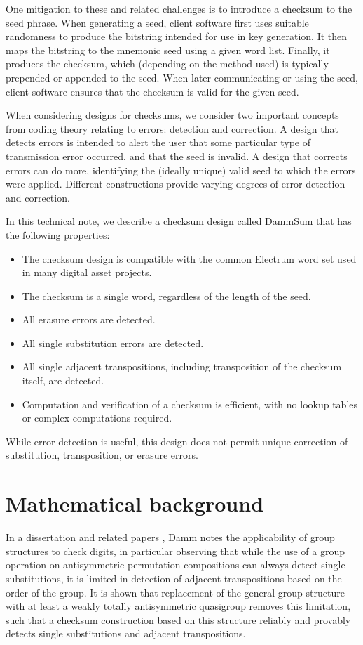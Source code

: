 \documentclass{article}
\theoremstyle{plain}
\theoremstyle{definition}
\begin{document}
One mitigation to these and related challenges is to introduce a checksum to the seed phrase.
When generating a seed, client software first uses suitable randomness to produce the bitstring intended for use in key generation.
It then maps the bitstring to the mnemonic seed using a given word list.
Finally, it produces the checksum, which (depending on the method used) is typically prepended or appended to the seed.
When later communicating or using the seed, client software ensures that the checksum is valid for the given seed.

When considering designs for checksums, we consider two important concepts from coding theory relating to errors: detection and correction.
A design that detects errors is intended to alert the user that some particular type of transmission error occurred, and that the seed is invalid.
A design that corrects errors can do more, identifying the (ideally unique) valid seed to which the errors were applied.
Different constructions provide varying degrees of error detection and correction.

In this technical note, we describe a checksum design called DammSum that has the following properties:
\begin{itemize}
	\item The checksum design is compatible with the common Electrum word set used in many digital asset projects.
	\item The checksum is a single word, regardless of the length of the seed.
	\item All erasure errors are detected.
	\item All single substitution errors are detected.
	\item All single adjacent transpositions, including transposition of the checksum itself, are detected.
	\item Computation and verification of a checksum is efficient, with no lookup tables or complex computations required.
\end{itemize}

While error detection is useful, this design does not permit unique correction of substitution, transposition, or erasure errors.


\section{Mathematical background}

In a dissertation \cite{damm_thesis} and related papers \cite{damm2000,damm2007}, Damm notes the applicability of group structures to check digits, in particular observing that while the use of a group operation on antisymmetric permutation compositions can always detect single substitutions, it is limited in detection of adjacent transpositions based on the order of the group.
It is shown that replacement of the general group structure with at least a weakly totally antisymmetric quasigroup removes this limitation, such that a checksum construction based on this structure reliably and provably detects single substitutions and adjacent transpositions.
\end{document}
